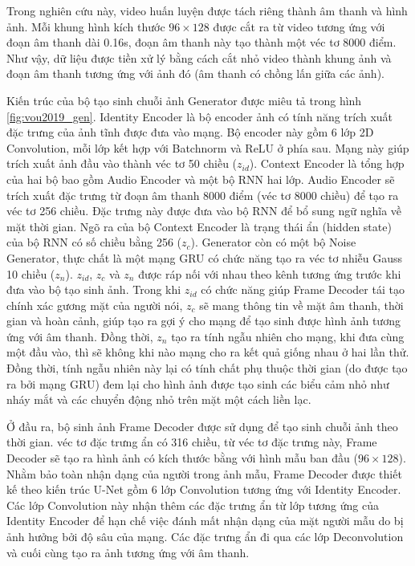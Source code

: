 Trong nghiên cứu này, video huấn luyện được tách riêng thành âm thanh và hình ảnh. Mỗi khung hình kích thước $96\times128$ được cắt ra từ video tương ứng với đoạn âm thanh dài 0.16s, đoạn âm thanh này tạo thành một véc tơ 8000 điểm. Như vậy, dữ liệu được tiền xử lý bằng cách cắt nhỏ video thành khung ảnh và đoạn âm thanh tương ứng với ảnh đó (âm thanh có chồng lấn giữa các ảnh).

Kiến trúc của bộ tạo sinh chuỗi ảnh Generator được miêu tả trong hình \ref{fig:vou2019_gen}. Identity Encoder là bộ encoder ảnh có tính năng trích xuất đặc trưng của ảnh tĩnh được đưa vào mạng. Bộ encoder này gồm 6 lớp 2D Convolution, mỗi lớp kết hợp với Batchnorm và ReLU ở phía sau. Mạng này giúp trích xuất ảnh đầu vào thành véc tơ 50 chiều ($z_{id}$). Context Encoder là tổng hợp của hai bộ bao gồm Audio Encoder và một bộ RNN hai lớp. Audio Encoder sẽ trích xuất đặc trưng từ đoạn âm thanh 8000 điểm (véc tơ 8000 chiều) để tạo ra véc tơ 256 chiều. Đặc trưng này được đưa vào bộ RNN để bổ sung ngữ nghĩa về mặt thời gian. Ngõ ra của bộ Context Encoder là trạng thái ẩn (hidden state) của bộ RNN có số chiều bằng 256 ($z_c$). Generator còn có một bộ Noise Generator, thực chất là một mạng GRU có chức năng tạo ra véc tơ nhiễu Gauss 10 chiều ($z_n$). $z_{id}$, $z_c$ và $z_n$ được ráp nối với nhau theo kênh tương ứng trước khi đưa vào bộ tạo sinh ảnh. Trong khi $z_{id}$ có chức năng giúp Frame Decoder tái tạo chính xác gương mặt của người nói, $z_c$ sẽ mang thông tin về mặt âm thanh, thời gian và hoàn cảnh, giúp tạo ra gợi ý cho mạng để tạo sinh được hình ảnh tương ứng với âm thanh. Đồng thời, $z_n$ tạo ra tính ngẫu nhiên cho mạng, khi đưa cùng một đầu vào, thì sẽ không khi nào mạng cho ra kết quả giống nhau ở hai lần thử. Đồng thời, tính ngẫu nhiên này lại có tính chất phụ thuộc thời gian (do được tạo ra bởi mạng GRU) đem lại cho hình ảnh được tạo sinh các biểu cảm nhỏ như nháy mắt và các chuyển động nhỏ trên mặt một cách liền lạc.

Ở đầu ra, bộ sinh ảnh Frame Decoder được sử dụng để tạo sinh chuỗi ảnh theo thời gian. véc tơ đặc trưng ẩn có 316 chiều, từ véc tơ đặc trưng này, Frame Decoder sẽ tạo ra hình ảnh có kích thước bằng với hình mẫu ban đầu ($96\times128$). Nhằm bảo toàn nhận dạng của người trong ảnh mẫu, Frame Decoder được thiết kế theo kiến trúc U-Net gồm 6 lớp Convolution tương ứng với Identity Encoder. Các lớp Convolution này nhận thêm các đặc trưng ẩn từ lớp tương ứng của Identity Encoder để hạn chế việc đánh mất nhận dạng của mặt người mẫu do bị ảnh hưởng bởi độ sâu của mạng. Các đặc trưng ẩn đi qua các lớp Deconvolution và cuối cùng tạo ra ảnh tương ứng với âm thanh.


